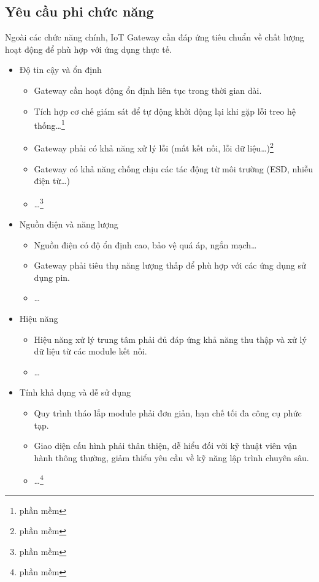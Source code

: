         \subsection{Yêu cầu phi chức năng}
            Ngoài các chức năng chính, IoT Gateway cần đáp ứng tiêu chuẩn về chất lượng hoạt động để phù hợp với ứng dụng thực tế.
            \begin{itemize}
                \item Độ tin cậy và ổn định
                \begin{itemize}
                    \item Gateway cần hoạt động ổn định liên tục trong thời gian dài.
                    \item Tích hợp cơ chế giám sát để tự động khởi động lại khi gặp lỗi treo hệ thống\dots\footnote{phần mềm}
                    \item Gateway phải có khả năng xử lý lỗi (mất kết nối, lỗi dữ liệu\dots)\footnote{phần mềm}
                    \item Gateway có khả năng chống chịu các tác động từ môi trường (ESD, nhiễu điện từ\dots)
                    \item \dots\footnote{phần mềm}
                \end{itemize}
                \item Nguồn điện và năng lượng
                \begin{itemize}
                    \item Nguồn điện có độ ổn định cao, bảo vệ quá áp, ngắn mạch\dots
                    \item Gateway phải tiêu thụ năng lượng thấp để phù hợp với các ứng dụng sử dụng pin.
                    \item \dots
                \end{itemize}
                \item Hiệu năng
                \begin{itemize}
                    \item Hiệu năng xử lý trung tâm phải đủ đáp ứng khả năng thu thập và xử lý dữ liệu từ các module kết nối.
                    \item \dots
                \end{itemize}
                \item Tính khả dụng và dễ sử dụng
                \begin{itemize}
                    \item Quy trình tháo lắp module phải đơn giản, hạn chế tối đa công cụ phức tạp.
                    \item Giao diện cấu hình phải thân thiện, dễ hiểu đối với kỹ thuật viên vận hành thông thường, giảm thiểu yêu cầu về kỹ năng lập trình chuyên sâu.
                    \item \dots\footnote{phần mềm}
                \end{itemize}
            \end{itemize}

